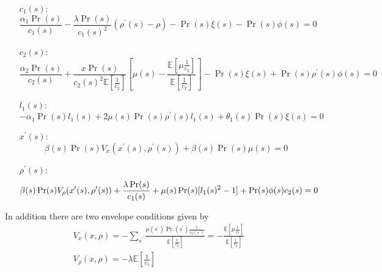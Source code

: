 \documentclass[thmsb,11pt]{article}
\begin{document}
\begin{enumerate}
\item[$c_1(s):$]
\begin{equation}
\frac{\alpha_1\Pr(s)}{c_1(s)}-\frac{\lambda \Pr(s)}{c_1(s)^2}(\rho^{\prime
}(s)-\rho)-\Pr(s)\xi(s)-\Pr(s)\phi(s) = 0  \label{eq.c1FOC}
\end{equation}

\item[$c_2(s):$]
\begin{equation}
\frac{\alpha_2 \Pr(s)}{c_2(s)} + \frac{x\Pr(s)}{c_2(s)^2\mathbb{E}[\frac1{c_2}]}%
\left[\mu(s)-\frac{\mathbb{E}[\mu\frac1{c_2}]}{\mathbb{E}[\frac1{c_2}]}%
\right]-\Pr(s)\xi(s)+\Pr(s)\rho^{\prime }(s)\phi(s)=0  \label{eq.c2FOC}
\end{equation}

\item[$l_1(s):$]
\begin{equation}
-\alpha_1\Pr(s)l_1(s)+2\mu(s)\Pr(s)\rho^{\prime
}(s)l_1(s)+\theta_1(s)\Pr(s)\xi(s)=0
\end{equation}

\item[$x^{\prime }(s):$]
\begin{equation}
\beta(s) \Pr(s)V_x(x^{\prime }(s),\rho^{\prime }(s)) + \beta(s)\Pr(s)\mu(s) = 0
\label{eq.x'FOC}
\end{equation}

\item[$\rho^{\prime }(s):$]
\begin{equation}
\beta(s) \Pr(s) V_{\rho}(x^{\prime }(s),\rho^{\prime }(s))+\frac{\lambda \Pr(s)}{%
c_1(s)}+\mu(s)\Pr(s)[l_1(s)^2-1]+\Pr(s)\phi(s)c_2(s) = 0  \label{eq.FOCNend}
\end{equation}
\end{enumerate}

In addition there are two envelope conditions given by
\begin{align}
V_x(x,\rho) = -\sum_{s^{\prime }}\frac{\mu(s^{\prime })\Pr(s^{\prime
})\frac1{c_2(s^{\prime })}}{\mathbb{E}[\frac1{c_2}]} = -\frac{\mathbb{E}%
[\mu\frac1{c_2}]}{\mathbb{E}[\frac1{c_2}]} \\
V_{\rho}(x,\rho) = -\lambda\mathbb{E}[\frac1{c_1}]  \label{eq.rho_env}
\end{align}
\end{document}
